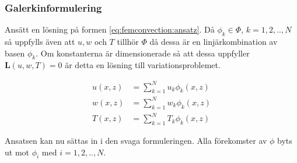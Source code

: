 \subsubsection{Galerkinformulering}

Ansätt en lösning på formen \eqref{eq:femconvection:ansatz}.
Då $\phi_k \in \Phi$, $k=1,2,..,N$ så uppfylls även att $u,w$ och $T$ tillhör
$\Phi$ då dessa är en linjärkombination av basen $\phi_k$. Om konstanterna
är dimensionerade så att dessa uppfyller $\mathbf{L}(u,w,T) = 0$ är detta
en lösning till variationsproblemet. \cite{johnson2009}\cite{heath2002}\cite{lewis04}

\begin{align}
u(x,z) &= \sum^N_{k=1}u_k\phi_k(x,z)
\nonumber \\
w(x,z) &= \sum^N_{k=1}w_k\phi_k(x,z)
\nonumber \\
T(x,z) &= \sum^N_{k=1}T_k\phi_k(x,z)
\label{eq:femconvection:ansatz}
\end{align}

\noindent
Ansatsen kan nu sättas in i den svaga formuleringen.
Alla förekomster av $\phi$ byts ut mot $\phi_i$ med $i=1,2,..,N$.
